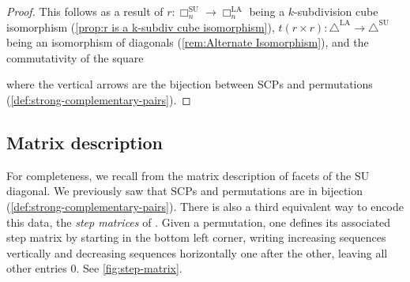 \documentclass{amsart}
\newcommand{\darkblue}{\color{darkblue}} %
\theoremstyle{definition}
\newcommand{\defn}[1]{\textsl{\darkblue #1}} %
\newcommand{\SU}{\mathrm{SU}}
\newcommand{\LA}{\mathrm{LA}}
\newcommand{\SUD}{\triangle^{\mathrm{SU}}}
\newcommand{\LAD}{\triangle^{\mathrm{LA}}}
\newcommand{\SCP}{\mathrm{SCP}}
\newcommand{\divcube}[1]{\Box_{#1}}
\begin{document}
\begin{proof}
This follows as a result of $r:\divcube{n}^{\SU}\to \divcube{n}^{\LA}$ being a $k$-subdivision cube isomorphism (\cref{prop:r is a k-subdiv cube isomorphism}), $t(r\times r):\LAD\to \SUD$ being an isomorphism of diagonals (\cref{rem:Alternate Isomorphism}), and the commutativity of the square 
\begin{center}
\end{center}
where the vertical arrows are the bijection between SCPs and permutations (\cref{def:strong-complementary-pairs}).
\end{proof}






\subsection{Matrix description}
\label{subsec:matrix}

For completeness, we recall from \cite{SaneblidzeUmble} the matrix description of facets of the $\SU$ diagonal.
We previously saw that $\SCP$s and permutations are in bijection (\cref{def:strong-complementary-pairs}). 
There is also a third equivalent way to encode this data, the \defn{step matrices} of \cite[Def. 6]{SaneblidzeUmble}.
Given a permutation, one defines its associated step matrix by starting in the bottom left corner, writing increasing sequences vertically and decreasing sequences horizontally one after the other, leaving all other entries $0$.
See \cref{fig:step-matrix}.
\end{document}
